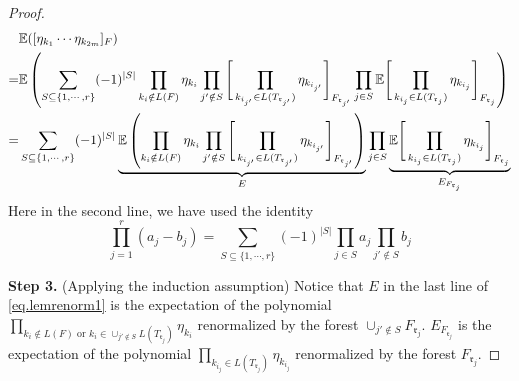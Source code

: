 \begin{proof}
\begingroup
    \allowdisplaybreaks
    \begin{align}\label{eq.lemrenorm1}
        &\mathbb{E}([\eta_{k_1}\cdots \eta_{k_{2m}}]_F)\notag
        \\
        =&\mathbb{E}\left(\sum_{S\subseteq\{1,\cdots,r\}}(-1)^{|S|}\prod_{k_i\notin L(F)} \eta_{k_i} \prod_{j'\notin S} \Bigg[\prod_{k_{i_{j'}}\in L(T_{\mathfrak{r}_{j'}})}\eta_{k_{i_{j'}}}\Bigg]_{F_{\mathfrak{r}_{j'}}}
        \prod_{j\in S}\mathbb{E}\Bigg[\prod_{k_{i_{j}}\in L(T_{\mathfrak{r}_j})}\eta_{k_{i_j}}\Bigg]_{F_{\mathfrak{r}_j}}\right)
        \\
        =&\sum_{S\subseteq\{1,\cdots,r\}}(-1)^{|S|}\underbrace{\mathbb{E}\left(\prod_{k_{i}\notin L(F)} \eta_{k_i} \prod_{j'\notin S} \Bigg[\prod_{k_{i_{j'}}\in L(T_{\mathfrak{r}_{j'}})}\eta_{k_{i_{j'}}}\Bigg]_{F_{\mathfrak{r}_{j'}}}\right)}_{E}
        \prod_{j\in S}\underbrace{\mathbb{E}\Bigg[\prod_{k_{i_{j}}\in L(T_{\mathfrak{r}_j})}\eta_{k_{i_j}}\Bigg]_{F_{\mathfrak{r}_j}}}_{E_{F_{\mathfrak{r}_j}}}\notag
    \end{align}
\endgroup
Here in the second line, we have used the identity 
\begin{equation}
    \prod_{j=1}^r (a_j-b_j)=\sum_{S\subseteq\{1,\cdots,r\}}(-1)^{|S|} \prod_{j\in S}a_j\prod_{j'\notin S}b_j
\end{equation}




\textbf{Step 3.} (Applying the induction assumption) Notice that $E$ in the last line of \eqref{eq.lemrenorm1} is the expectation of the polynomial $\prod_{k_i\notin L(F)\text{ or }k_i\in \cup_{j'\notin S}L(T_{\mathfrak{r}_j})}\eta_{k_i}$ renormalized by the forest $\cup_{j'\notin S}F_{\mathfrak{r}_j}$. $E_{F_{\mathfrak{r}_j}}$ is the expectation of the polynomial $\prod_{k_{i_{j}}\in L(T_{\mathfrak{r}_j})}\eta_{k_{i_j}}$ renormalized by the forest $F_{\mathfrak{r}_j}$. 



\end{proof}
